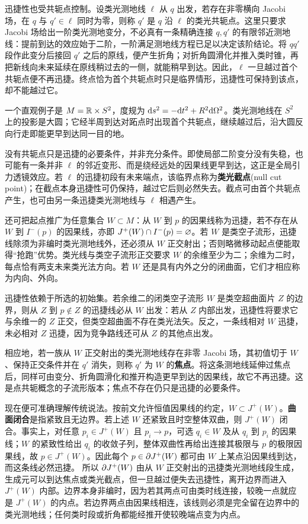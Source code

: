 迅捷性也受共轭点控制。设类光测地线 $\ell$ 从 $q$ 出发，若存在非零横向 Jacobi 场，在 $q$ 与 $q'\in\ell$ 同时为零，则称 $q'$ 是 $q$ 沿 $\ell$ 的类光共轭点。这里只要求 Jacobi 场给出一阶类光测地变分，不必真有一条精确连接 $q,q'$ 的有限邻近测地线：提前到达的效应始于二阶，一阶满足测地线方程已足以决定该阶结论。将 $qq'$ 段作此变分后接回 $q'$ 之后的原线，便产生折角；对折角圆滑化并推入类时锥，再把新线向未来延续在原线稍过去的一侧，就能稍早到达。因此，$\ell$ 一旦越过首个共轭点便不再迅捷。终点恰为首个共轭点时只是临界情形，迅捷性可保持到该点，却不能越过它。

一个直观例子是 $M=\mathbb{R}\times S^2$，度规为 $\dd s^2=-\dd t^2+R^2\dd\Omega^2$。类光测地线在 $S^2$ 上的投影是大圆；它经半周到达对跖点时出现首个共轭点，继续越过后，沿大圆反向行走即能更早到达同一目的地。

没有共轭点只是迅捷的必要条件，并非充分条件。即使局部二阶变分没有失稳，也可能有一条并非 $\ell$ 的邻近变形、而是绕经远处的因果线更早到达，这正是全局引力透镜效应。若 $\ell$ 的迅捷初段有未来端点，该临界点称为\textbf{类光截点}(null cut point)；在截点本身迅捷性可仍保持，越过它后则必然失去。截点可由首个共轭点产生，也可由另一条迅捷类光测地线与 $\ell$ 相遇产生。

还可把起点推广为任意集合 $W\subset M$：从 $W$ 到 $p$ 的因果线称为迅捷，若不存在从 $W$ 到 $I^-(p)$ 的因果线，亦即 $J^+(W)\cap I^-(p)=\varnothing$。若 $W$ 是类空子流形，迅捷线除须为非编时类光测地线外，还必须从 $W$ 正交射出；否则略微移动起点便能取得“抢跑”优势。类光线与类空子流形正交要求 $W$ 的余维至少为二；余维为二时，每点恰有两支未来类光法方向。若 $W$ 还是具有内外之分的闭曲面，它们才相应称为内向、外向。

迅捷性依赖于所选的初始集。若余维二的闭类空子流形 $W$ 是类空超曲面片 $Z$ 的边界，则从 $Z$ 到 $p\notin Z$ 的迅捷线必从 $W$ 出发：若从 $Z$ 内部出发，迅捷性将要求它与余维一的 $Z$ 正交，但类空超曲面不存在类光法矢。反之，一条线相对 $W$ 迅捷，未必相对 $Z$ 迅捷，因为竞争路线还可从 $Z$ 的其他点出发。

相应地，若一族从 $W$ 正交射出的类光测地线存在非零 Jacobi 场，其初值切于 $W$、保持正交条件并在 $q'$ 消失，则称 $q'$ 为 $W$ 的\textbf{焦点}。将这条测地线延伸过焦点后，同样可由变分、折角圆滑化和推开构造更早到达的因果线，故它不再迅捷。这是点共轭概念的子流形版本；焦点不存在仍只是迅捷的必要条件。

现在便可准确理解传统说法。按前文允许恒值因果线的约定，$W\subset J^+(W)$。\textbf{曲面闭合}是指紧致且无边界。若上述 $W$ 还紧致且时空整体双曲，则 $J^+(W)$ 闭合。事实上，对任意 $p_i\in J^+(W)$ 且 $p_i\to p$，可选 $q_i\in W$ 及从 $q_i$ 到 $p_i$ 的因果线；$W$ 的紧致性给出 $q_i$ 的收敛子列，整体双曲性再给出连接其极限与 $p$ 的极限因果线，故 $p\in J^+(W)$。因此每个 $p\in\partial J^+(W)$ 都可由 $W$ 上某点沿因果线到达，而这条线必然迅捷。
所以 $\partial J^+(W)$ 由从 $W$ 正交射出的迅捷类光测地线段生成，生成元可以到达焦点或类光截点，但一旦越过便失去迅捷性，离开边界而进入 $J^+(W)$ 内部。边界本身非编时，因为若其两点可由类时线连接，较晚一点就应是 $J^+(W)$ 的内点。若边界两点由因果线相连，该线则必须是完全留在边界中的类光测地线；任何类时段或折角都能经推开使较晚端点变为内点。

